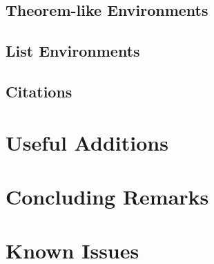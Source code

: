 \documentclass[logo]{mlai-report}
\begin{document}
	\subsection{Theorem-like Environments} 
	
	\subsection{List Environments} 
	
	\subsection{Citations} 
	
	\section{Useful Additions} 
	
	\section{Concluding Remarks}
	
	\printbibliography
	
	\appendix
	
	\section{Known Issues} 
\end{document}
